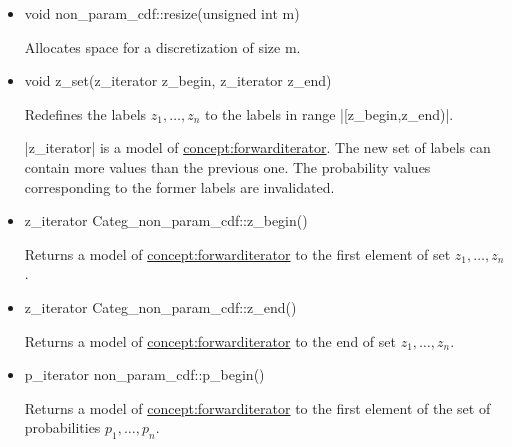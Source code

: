 \documentclass[12pt,twoside]{report}
\begin{document}
\begin{itemize}
\item
 \begin{code}
void non_param_cdf::resize(unsigned int m)
\end{code}


Allocates space for a discretization of size m. 



\item
 \begin{code}
void z_set(z_iterator z_begin, z_iterator z_end)
\end{code}

Redefines the labels $z_1,\ldots,z_n$ to the labels in range |[z_begin,z_end)|. 

|z_iterator| is a model of \hyperref{Forward Iterator}{Forward Iterator (see Section}{)}{concept:forwarditerator}.
The new set of labels can contain more values than the previous one. The probability values corresponding to the former labels are invalidated.

%
%

\item
 \begin{code}
z_iterator Categ_non_param_cdf::z_begin()
\end{code}

Returns a model of \hyperref{Forward Iterator}{Forward Iterator (see Section}{)}{concept:forwarditerator} to the first element of set $z_1,\ldots,z_n$.

\item
 \begin{code}
z_iterator Categ_non_param_cdf::z_end()
\end{code}

Returns a model of \hyperref{Forward Iterator}{Forward Iterator (see Section}{)}{concept:forwarditerator} to the end of set $z_1,\ldots,z_n$.

\item
 \begin{code}
p_iterator non_param_cdf::p_begin()
\end{code}

Returns a model of \hyperref{Forward Iterator}{Forward Iterator (see Section}{)}{concept:forwarditerator} to the first element of the set of probabilities $p_1,\ldots,p_n$.


\end{itemize}
\end{document}
